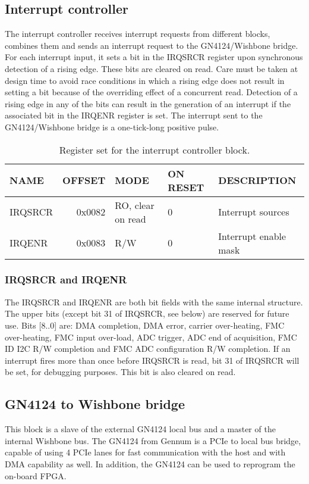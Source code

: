 \documentclass[a4paper]{article}
\begin{document}
\subsection{Interrupt controller}
The interrupt controller receives interrupt requests from different blocks, combines them and sends an interrupt request to the GN4124/Wishbone bridge. For each interrupt input, it sets a bit in the IRQSRCR register upon synchronous detection of a rising edge. These bits are cleared on read. Care must be taken at design time to avoid race conditions in which a rising edge does not result in setting a bit because of the overriding effect of a concurrent read. Detection of a rising edge in any of the bits can result in the generation of an interrupt if the associated bit in the IRQENR register is set. The interrupt sent to the GN4124/Wishbone bridge is a one-tick-long positive pulse.

\begin{table}[htbp]
  \centering
  \begin{tabularx}{\textwidth}{|l|r|X|l|l|}
    \hline
    \textbf{NAME} & \textbf{OFFSET} & \textbf{MODE} & \textbf{ON RESET} & \textbf{DESCRIPTION} \\
    \hline
    \hline
    IRQSRCR & 0x0082 & RO, clear on read & 0 & Interrupt sources\\
    \hline
    IRQENR & 0x0083 & R/W & 0 & Interrupt enable mask\\
    \hline
  \end{tabularx}
  \caption{Register set for the interrupt controller block.}
  \label{tab:irq_control}
\end{table}

\subsubsection{IRQSRCR and IRQENR}
The IRQSRCR and IRQENR are both bit fields with the same internal structure. The upper bits (except bit 31 of IRQSRCR, see below) are reserved for future use. Bits [8..0] are: DMA completion, DMA error, carrier over-heating, FMC over-heating, FMC input over-load, ADC trigger, ADC end of acquisition, FMC ID I2C R/W completion and FMC ADC configuration R/W completion. If an interrupt fires more than once before IRQSRCR is read, bit 31 of IRQSRCR will be set, for debugging purposes. This bit is also cleared on read.   

\subsection{GN4124 to Wishbone bridge}
\label{ssec:GN4124_WB}
This block is a slave of the external GN4124 local bus and a master of the internal Wishbone bus. The GN4124 from Gennum is a PCIe to local bus bridge, capable of using 4 PCIe lanes for fast communication with the host and with DMA capability as well. In addition, the GN4124 can be used to reprogram the on-board FPGA. 
\end{document}
